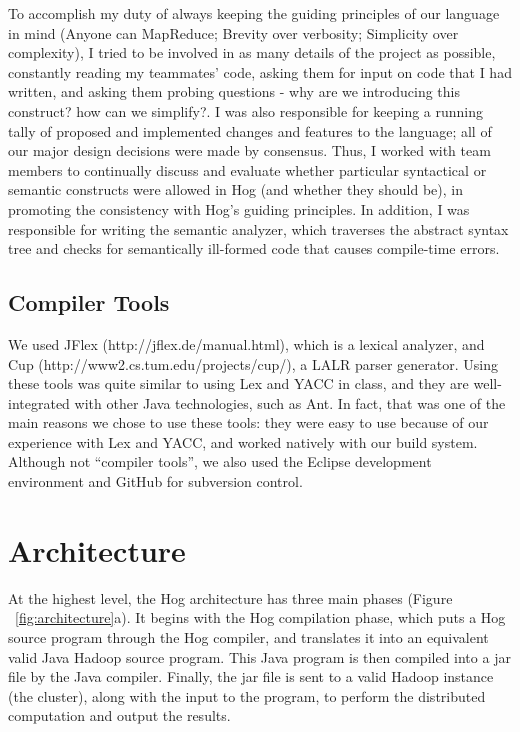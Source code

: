 \documentclass{report}
\begin{document}
To accomplish my duty of always keeping the guiding principles of our language in mind (Anyone can MapReduce; Brevity over verbosity; Simplicity over complexity), I tried to be involved in as many details of the project as possible, constantly reading my teammates' code, asking them for input on code that I had written, and asking them probing questions - why are we introducing this construct? how can we simplify?. I was also responsible for keeping a running tally of proposed and implemented changes and features to the language; all of our major design decisions were made by consensus. Thus, I worked with team members to continually discuss and evaluate whether particular syntactical or semantic constructs were allowed in Hog (and whether they should be), in promoting the consistency with Hog's guiding principles. In addition, I was responsible for writing the semantic analyzer, which traverses the abstract syntax tree and checks for semantically ill-formed code that causes compile-time errors.

\subsection{Compiler Tools}
We used JFlex (http://jflex.de/manual.html), which is a lexical analyzer, and Cup (http://www2.cs.tum.edu/projects/cup/), a LALR parser generator. Using these tools was quite similar to using Lex and YACC in class, and they are well-integrated with other Java technologies, such as Ant. In fact, that was one of the main reasons we chose to use these tools: they were easy to use because of our experience with Lex and YACC, and worked natively with our build system. Although not ``compiler tools'', we also used the Eclipse development environment and GitHub for subversion control.


\section{Architecture}
At the highest level, the Hog architecture has three main phases (Figure ~\ref{fig:architecture}a). It begins with the Hog compilation phase, which puts a Hog source program through the Hog compiler, and translates it into an equivalent valid Java Hadoop source program. This Java program is then compiled into a jar file by the Java compiler. Finally, the jar file is sent to a valid Hadoop instance (the cluster), along with the input to the program, to perform the distributed computation and output the results.
\end{document}
